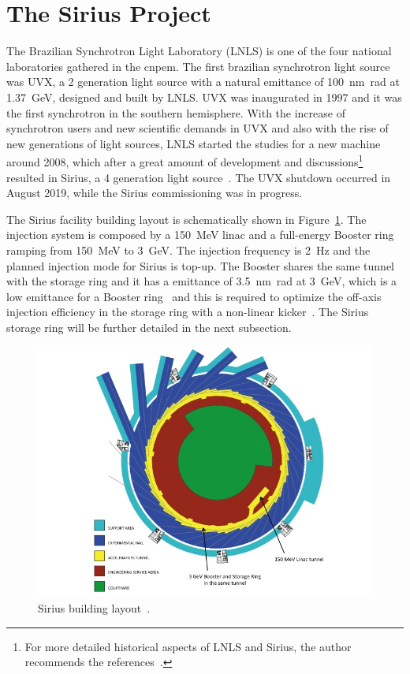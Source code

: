 \section{The Sirius Project}\label{sec:sirius_project}
The Brazilian Synchrotron Light Laboratory (LNLS) is one of the four national laboratories gathered in the \gls{cnpem}. The first brazilian synchrotron light source was UVX, a 2 generation light source with a natural emittance of \SI{100}{\nano\meter\radian} at \SI{1.37}{\giga\electronvolt}, designed and built by LNLS. UVX was inaugurated in 1997 and it was the first synchrotron in the southern hemisphere. With the increase of synchrotron users and new scientific demands in UVX and also with the rise of new generations of light sources, LNLS started the studies for a new machine around 2008, which after a great amount of development and discussions\footnote{For more detailed historical aspects of LNLS and Sirius, the author recommends the references~\cite{liu2019, aldo2019}.} resulted in Sirius, a 4 generation light source~\cite{liu2014}. The UVX shutdown occurred in August 2019, while the Sirius commissioning was in progress.

The Sirius facility building layout is schematically shown in Figure~\ref{fig:sirius_building}. The injection system is composed by a \SI{150}{\mega\electronvolt} \gls{linac} and a full-energy Booster ring ramping from \SI{150}{\mega\electronvolt} to \SI{3}{\giga\electronvolt}. The injection frequency is \SI{2}{\hertz} and the planned injection mode for Sirius is top-up. The Booster shares the same tunnel with the storage ring and it has a emittance of \SI{3.5}{\nano\meter\radian} at \SI{3}{\giga\electronvolt}, which is a low emittance for a Booster ring~\cite{sa2014a} and this is required to optimize the off-axis injection efficiency in the storage ring with a non-linear kicker~\cite{liu2016a}. The Sirius storage ring will be further detailed in the next subsection.
\begin{figure}
    \centering
    \includegraphics[scale=0.5]{figures/sirius_building.jpg}
    \caption{Sirius building layout~\cite{wiki}.}
    \label{fig:sirius_building}
\end{figure}
